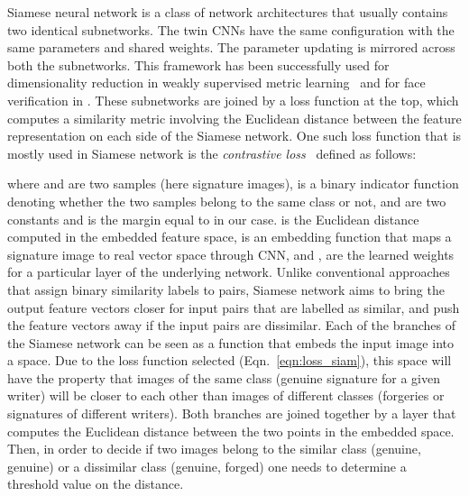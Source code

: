 \documentclass[times,twocolumn,final]{elsarticle}
\newcommand{\eq}[1]{Eqn.~\ref{#1}}
\begin{document}
Siamese neural network is a class of network architectures that usually contains two identical subnetworks. The twin CNNs have the same configuration with the same parameters and shared weights. The parameter updating is mirrored across both the subnetworks. This framework has been successfully used for dimensionality reduction in weakly supervised metric learning~\cite{Chopra2005} and for face verification in \cite{Schroff2015}. These subnetworks are joined by a loss function at the top, which computes a similarity metric involving the Euclidean distance between the feature representation on each side of the Siamese network. One such loss function that is mostly used in Siamese network is the \emph{contrastive loss}~\cite{Chopra2005} defined as follows:




where  and  are two samples (here signature images),  is a binary indicator function denoting whether the two samples belong to the same class or not,  and  are two constants and  is the margin equal to  in our case.  is the Euclidean distance computed in the embedded feature space,  is an embedding function that maps a signature image to real vector space through CNN, and ,  are the learned weights for a particular layer of the underlying network. Unlike conventional approaches that assign binary similarity labels to pairs, Siamese network aims to bring the output feature vectors closer for input pairs that are labelled as similar, and push the feature vectors away if the input pairs are dissimilar. Each of the branches of the Siamese network can be seen as a function that embeds the input image into a space. Due to the loss function selected (\eq{eqn:loss_siam}), this space will have the property that images of the same class (genuine signature for a given writer) will be closer to each other than images of different classes (forgeries or signatures of different writers). Both branches are joined together by a layer that computes the Euclidean distance between the two points in the embedded space. Then, in order to decide if two images belong to the similar class (genuine, genuine) or a dissimilar class (genuine, forged) one needs to determine a threshold value on the distance.
\end{document}
